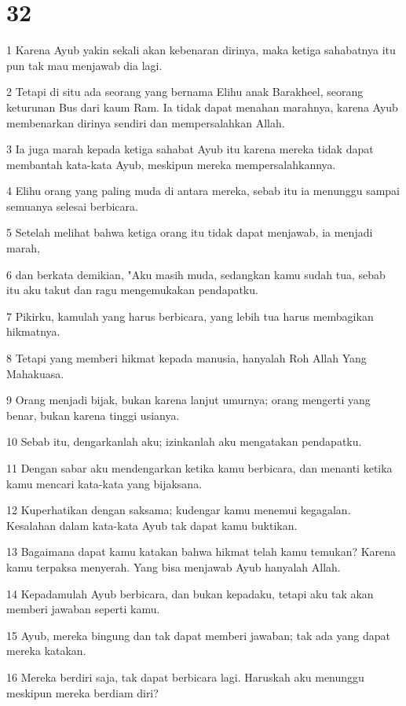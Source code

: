 \chapter{32}

\par 1 Karena Ayub yakin sekali akan kebenaran dirinya, maka ketiga sahabatnya itu pun tak mau menjawab dia lagi.
\par 2 Tetapi di situ ada seorang yang bernama Elihu anak Barakheel, seorang keturunan Bus dari kaum Ram. Ia tidak dapat menahan marahnya, karena Ayub membenarkan dirinya sendiri dan mempersalahkan Allah.
\par 3 Ia juga marah kepada ketiga sahabat Ayub itu karena mereka tidak dapat membantah kata-kata Ayub, meskipun mereka mempersalahkannya.
\par 4 Elihu orang yang paling muda di antara mereka, sebab itu ia menunggu sampai semuanya selesai berbicara.
\par 5 Setelah melihat bahwa ketiga orang itu tidak dapat menjawab, ia menjadi marah,
\par 6 dan berkata demikian, "Aku masih muda, sedangkan kamu sudah tua, sebab itu aku takut dan ragu mengemukakan pendapatku.
\par 7 Pikirku, kamulah yang harus berbicara, yang lebih tua harus membagikan hikmatnya.
\par 8 Tetapi yang memberi hikmat kepada manusia, hanyalah Roh Allah Yang Mahakuasa.
\par 9 Orang menjadi bijak, bukan karena lanjut umurnya; orang mengerti yang benar, bukan karena tinggi usianya.
\par 10 Sebab itu, dengarkanlah aku; izinkanlah aku mengatakan pendapatku.
\par 11 Dengan sabar aku mendengarkan ketika kamu berbicara, dan menanti ketika kamu mencari kata-kata yang bijaksana.
\par 12 Kuperhatikan dengan saksama; kudengar kamu menemui kegagalan. Kesalahan dalam kata-kata Ayub tak dapat kamu buktikan.
\par 13 Bagaimana dapat kamu katakan bahwa hikmat telah kamu temukan? Karena kamu terpaksa menyerah. Yang bisa menjawab Ayub hanyalah Allah.
\par 14 Kepadamulah Ayub berbicara, dan bukan kepadaku, tetapi aku tak akan memberi jawaban seperti kamu.
\par 15 Ayub, mereka bingung dan tak dapat memberi jawaban; tak ada yang dapat mereka katakan.
\par 16 Mereka berdiri saja, tak dapat berbicara lagi. Haruskah aku menunggu meskipun mereka berdiam diri?

